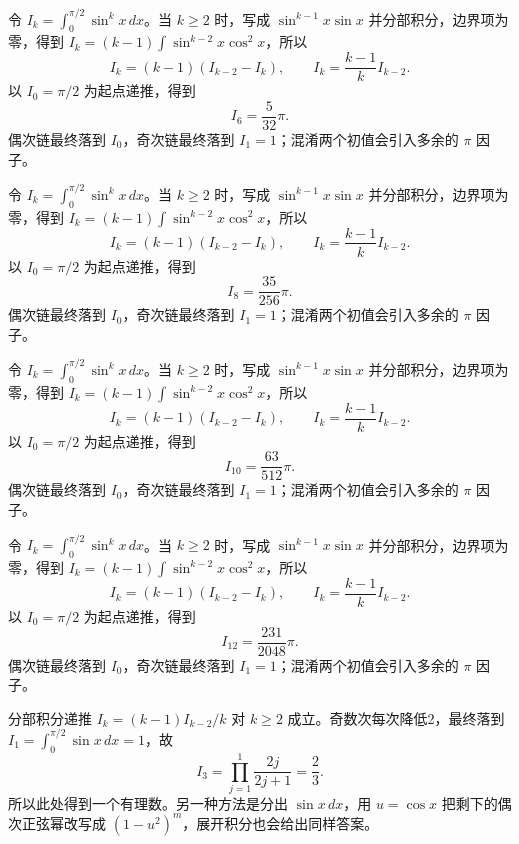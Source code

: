 \documentclass[UTF8,12pt,a4paper,fontset=fandol]{ctexart}
\begin{document}
\begin{solve}\label{ans:c16q3}
令 $I_k=\int_0^{\pi/2}\sin^kx\,dx$。当 $k\ge2$ 时，写成 $\sin^{k-1}x\sin x$ 并分部积分，边界项为零，得到 $I_k=(k-1)\int\sin^{k-2}x\cos^2x$，所以
\[
I_k=(k-1)(I_{k-2}-I_k),\qquad I_k=\frac{k-1}{k}I_{k-2}.
\]
以 $I_0=\pi/2$ 为起点递推，得到
\[
I_{6}=\frac{5}{32}\pi.
\]
偶次链最终落到 $I_0$，奇次链最终落到 $I_1=1$；混淆两个初值会引入多余的 $\pi$ 因子。
\end{solve}

\begin{solve}\label{ans:c16q4}
令 $I_k=\int_0^{\pi/2}\sin^kx\,dx$。当 $k\ge2$ 时，写成 $\sin^{k-1}x\sin x$ 并分部积分，边界项为零，得到 $I_k=(k-1)\int\sin^{k-2}x\cos^2x$，所以
\[
I_k=(k-1)(I_{k-2}-I_k),\qquad I_k=\frac{k-1}{k}I_{k-2}.
\]
以 $I_0=\pi/2$ 为起点递推，得到
\[
I_{8}=\frac{35}{256}\pi.
\]
偶次链最终落到 $I_0$，奇次链最终落到 $I_1=1$；混淆两个初值会引入多余的 $\pi$ 因子。
\end{solve}

\begin{solve}\label{ans:c16q5}
令 $I_k=\int_0^{\pi/2}\sin^kx\,dx$。当 $k\ge2$ 时，写成 $\sin^{k-1}x\sin x$ 并分部积分，边界项为零，得到 $I_k=(k-1)\int\sin^{k-2}x\cos^2x$，所以
\[
I_k=(k-1)(I_{k-2}-I_k),\qquad I_k=\frac{k-1}{k}I_{k-2}.
\]
以 $I_0=\pi/2$ 为起点递推，得到
\[
I_{10}=\frac{63}{512}\pi.
\]
偶次链最终落到 $I_0$，奇次链最终落到 $I_1=1$；混淆两个初值会引入多余的 $\pi$ 因子。
\end{solve}

\begin{solve}\label{ans:c16q6}
令 $I_k=\int_0^{\pi/2}\sin^kx\,dx$。当 $k\ge2$ 时，写成 $\sin^{k-1}x\sin x$ 并分部积分，边界项为零，得到 $I_k=(k-1)\int\sin^{k-2}x\cos^2x$，所以
\[
I_k=(k-1)(I_{k-2}-I_k),\qquad I_k=\frac{k-1}{k}I_{k-2}.
\]
以 $I_0=\pi/2$ 为起点递推，得到
\[
I_{12}=\frac{231}{2048}\pi.
\]
偶次链最终落到 $I_0$，奇次链最终落到 $I_1=1$；混淆两个初值会引入多余的 $\pi$ 因子。
\end{solve}

\begin{solve}\label{ans:c16q7}
分部积分递推 $I_k=(k-1)I_{k-2}/k$ 对 $k\ge2$ 成立。奇数次每次降低2，最终落到 $I_1=\int_0^{\pi/2}\sin x\,dx=1$，故
\[
I_{3}=\prod_{j=1}^{1}\frac{2j}{2j+1}=\frac{2}{3}.
\]
所以此处得到一个有理数。另一种方法是分出 $\sin x\,dx$，用 $u=\cos x$ 把剩下的偶次正弦幂改写成 $(1-u^2)^m$，展开积分也会给出同样答案。
\end{solve}
\end{document}
